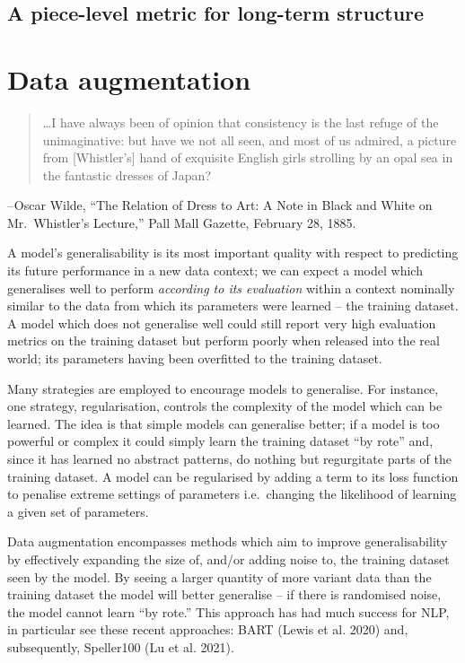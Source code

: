 \documentclass[12pt,a4paper,]{report}
\begin{document}
\hypertarget{a-piece-level-metric-for-long-term-structure}{%
\section{A piece-level metric for long-term
structure}\label{a-piece-level-metric-for-long-term-structure}}

\hypertarget{data-augmentation}{%
\chapter{Data augmentation}\label{data-augmentation}}

\begin{quote}
\ldots I have always been of opinion that consistency is the last refuge
of the unimaginative: but have we not all seen, and most of us admired,
a picture from {[}Whistler's{]} hand of exquisite English girls
strolling by an opal sea in the fantastic dresses of Japan?
\end{quote}

-- Oscar Wilde, ``The Relation of Dress to Art: A Note in Black and
White on Mr.~Whistler's Lecture,'' Pall Mall Gazette, February 28, 1885.

A model's generalisability is its most important quality with respect to
predicting its future performance in a new data context; we can expect a
model which generalises well to perform \emph{according to its
evaluation} within a context nominally similar to the data from which
its parameters were learned -- the training dataset. A model which does
not generalise well could still report very high evaluation metrics on
the training dataset but perform poorly when released into the real
world; its parameters having been overfitted to the training dataset.

Many strategies are employed to encourage models to generalise. For
instance, one strategy, regularisation, controls the complexity of the
model which can be learned. The idea is that simple models can
generalise better; if a model is too powerful or complex it could simply
learn the training dataset ``by rote'' and, since it has learned no
abstract patterns, do nothing but regurgitate parts of the training
dataset. A model can be regularised by adding a term to its loss
function to penalise extreme settings of parameters i.e.~changing the
likelihood of learning a given set of parameters.

Data augmentation encompasses methods which aim to improve
generalisability by effectively expanding the size of, and/or adding
noise to, the training dataset seen by the model. By seeing a larger
quantity of more variant data than the training dataset the model will
better generalise -- if there is randomised noise, the model cannot
learn ``by rote.'' This approach has had much success for NLP, in
particular see these recent approaches: BART (Lewis et al. 2020) and,
subsequently, Speller100 (Lu et al. 2021).
\end{document}
